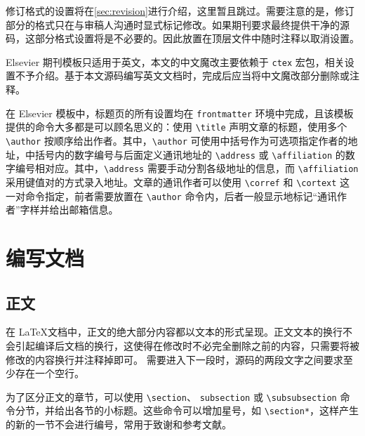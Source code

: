 修订格式的设置将在\cref{sec:revision}进行介绍，这里暂且跳过。需要注意的是，修订部分的格式只在与审稿人沟通时显式标记修改。如果期刊要求最终提供干净的源码，这部分格式设置将是不必要的。因此放置在顶层文件中随时注释以取消设置。


Elsevier 期刊模板只适用于英文，本文的中文魔改主要依赖于 \verb|ctex| 宏包，相关设置不予介绍。基于本文源码编写英文文档时，完成后应当将中文魔改部分删除或注释。


在 Elsevier 模板中，标题页的所有设置均在 \verb|frontmatter| 环境中完成，且该模板提供的命令大多都是可以顾名思义的：使用 \verb|\title| 声明文章的标题，使用多个 \verb|\author| 按顺序给出作者。其中，\verb|\author| 可使用中括号作为可选项指定作者的地址，中括号内的数字编号与后面定义通讯地址的 \verb|\address| 或 \verb|\affiliation| 的数字编号相对应。其中，\verb|\address| 需要手动分割各级地址的信息，而 \verb|\affiliation| 采用键值对的方式录入地址。文章的通讯作者可以使用 \verb|\corref| 和 \verb|\cortext| 这一对命令指定，前者需要放置在 \verb|\author| 命令内，后者一般显示地标记“通讯作者”字样并给出邮箱信息。




\section{编写文档} \label{sec:context}

\subsection{正文} \label{subsec:text}

在 \LaTeX 文档中，正文的绝大部分内容都以文本的形式呈现。正文文本的换行不会引起编译后文档的换行，这使得在修改时不必完全删除之前的内容，只需要将被修改的内容换行并注释掉即可。
需要进入下一段时，源码的两段文字之间要求至少存在一个空行。


为了区分正文的章节，可以使用 \verb|\section|、 \verb|subsection| 或 \verb|\subsubsection| 命令分节，并给出各节的小标题。这些命令可以增加星号，如 \verb|\section*|，这样产生的新的一节不会进行编号，常用于致谢和参考文献。


